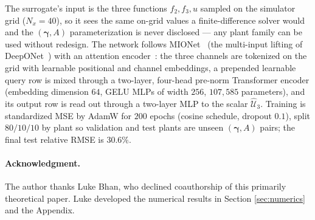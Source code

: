 \documentclass[twocolumn,amsthm]{autart}
\theoremstyle{plain}
\theoremstyle{definition}
\begin{document}
The surrogate's input is the three functions $f_2, f_3, u$ sampled on the simulator grid ($N_x = 40$), so it sees the same on-grid values a finite-difference solver would and the $(\bm\gamma, A)$ parameterization is never disclosed --- any plant family can be used without redesign. The network follows MIONet~\cite{Jin2022MIONet} (the multi-input lifting of DeepONet~\cite{Lu2021Universal}) with an attention encoder~\cite{Cao2021Galerkin,Hao2023GNOT,Vaswani2017Attention}: the three channels are tokenized on the grid with learnable positional and channel embeddings, a prepended learnable query row is mixed through a two-layer, four-head pre-norm Transformer encoder (embedding dimension $64$, GELU MLPs of width $256$, $107{,}585$ parameters), and its output row is read out through a two-layer MLP to the scalar $\widehat{\mathcal{U}}_3$. Training is standardized MSE by AdamW for $200$ epochs (cosine schedule, dropout $0.1$), split $80/10/10$ by plant so validation and test plants are unseen $(\bm\gamma, A)$ pairs; the final test relative RMSE is $30.6\%$.

\vspace*{-1em}
\paragraph*{\normalfont\bfseries Acknowledgment.}
The author thanks Luke Bhan, who declined coauthorship of this primarily theoretical paper. Luke developed the numerical results in Section \ref{sec:numerics} and the Appendix.



\end{document}
